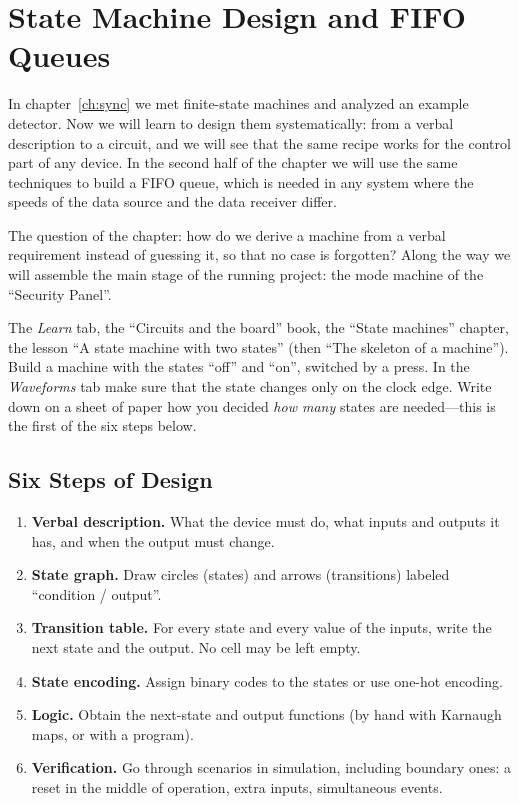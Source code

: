 \chapter{State Machine Design and FIFO Queues}
\label{ch:fsmdesign}

In chapter~\ref{ch:sync} we met finite-state machines and analyzed an example
detector. Now we will learn to design them systematically: from a verbal
description to a circuit, and we will see that the same recipe works for the
control part of any device. In the second half of the chapter we will use the
same techniques to build a FIFO queue, which is needed in any system where the
speeds of the data source and the data receiver differ.

The question of the chapter: how do we derive a machine from a verbal
requirement instead of guessing it, so that no case is forgotten? Along the way
we will assemble the main stage of the running project: the mode machine of the
``Security Panel''.

\begin{buildbox}
The \emph{Learn} tab, the ``Circuits and the board'' book, the ``State
machines'' chapter, the lesson ``A state machine with two states'' (then ``The
skeleton of a machine''). Build a machine with the states ``off'' and ``on'',
switched by a press. In the \emph{Waveforms} tab make sure that the state
changes only on the clock edge. Write down on a sheet of paper how you decided
\emph{how many} states are needed---this is the first of the six steps
below.
\end{buildbox}

\section{Six Steps of Design}

\begin{enumerate}
  \item \textbf{Verbal description.} What the device must do, what inputs and
        outputs it has, and when the output must change.
  \item \textbf{State graph.} Draw circles (states) and arrows (transitions)
        labeled ``condition / output''.
  \item \textbf{Transition table.} For every state and every value of the
        inputs, write the next state and the output. No cell may be left
        empty.
  \item \textbf{State encoding.} Assign binary codes to the states
        or use one-hot encoding.
  \item \textbf{Logic.} Obtain the next-state and output functions
        (by hand with Karnaugh maps, or with a program).
  \item \textbf{Verification.} Go through scenarios in simulation, including
        boundary ones: a reset in the middle of operation, extra inputs,
        simultaneous events.
\end{enumerate}

